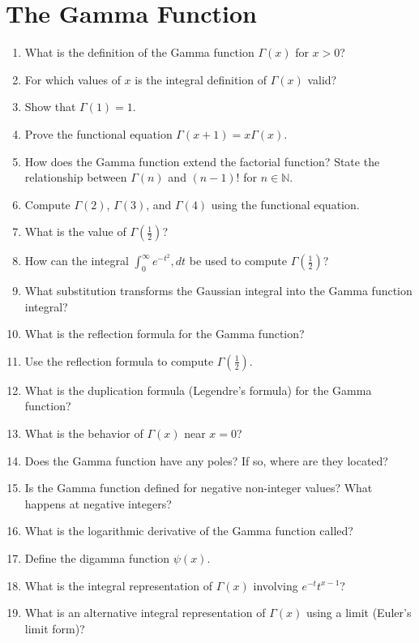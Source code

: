 \section{The Gamma Function}

\begin{enumerate}
  \item What is the definition of the Gamma function \(\Gamma(x)\) for \(x > 0\)?
  \item For which values of \(x\) is the integral definition of \(\Gamma(x)\) valid?
  \item Show that \(\Gamma(1) = 1\).
  \item Prove the functional equation \(\Gamma(x+1) = x\Gamma(x)\).
  \item How does the Gamma function extend the factorial function? State the relationship between \(\Gamma(n)\) and \((n-1)!\) for \(n \in \mathbb{N}\).
  \item Compute \(\Gamma(2)\), \(\Gamma(3)\), and \(\Gamma(4)\) using the functional equation.
  \item What is the value of \(\Gamma\left(\tfrac{1}{2}\right)\)?
  \item How can the integral \(\int_{0}^{\infty} e^{-t^{2}},dt\) be used to compute \(\Gamma\left(\tfrac{1}{2}\right)\)?
  \item What substitution transforms the Gaussian integral into the Gamma function integral?
  \item What is the reflection formula for the Gamma function?
  \item Use the reflection formula to compute \(\Gamma\left(\tfrac{1}{2}\right)\).
  \item What is the duplication formula (Legendre's formula) for the Gamma function?
  \item What is the behavior of \(\Gamma(x)\) near \(x = 0\)?
  \item Does the Gamma function have any poles? If so, where are they located?
  \item Is the Gamma function defined for negative non-integer values? What happens at negative integers?
  \item What is the logarithmic derivative of the Gamma function called?
  \item Define the digamma function \(\psi(x)\).
  \item What is the integral representation of \(\Gamma(x)\) involving \(e^{-t}t^{x-1}\)?
  \item What is an alternative integral representation of \(\Gamma(x)\) using a limit (Euler's limit form)?

\end{enumerate}
